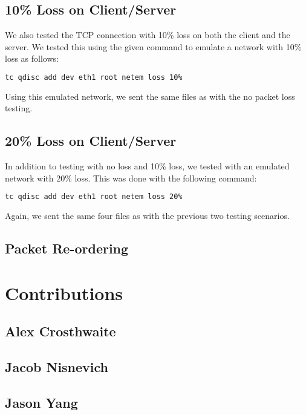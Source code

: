 \documentclass{article}
\begin{document}
\subsection{10\% Loss on Client/Server}

We also tested the TCP connection with 10\% loss on both the client and the server. We tested this using the given command to emulate a network with 10\% loss as follows:

\begin{lstlisting}[language=bash]
tc qdisc add dev eth1 root netem loss 10%
\end{lstlisting}

\noindent
Using this emulated network, we sent the same files as with the no packet loss testing.

\subsection{20\% Loss on Client/Server}

In addition to testing with no loss and 10\% loss, we tested with an emulated network with 20\% loss. This was done with the following command:

\begin{lstlisting}[language=bash]
tc qdisc add dev eth1 root netem loss 20%
\end{lstlisting}

\noindent
Again, we sent the same four files as with the previous two testing scenarios.

\subsection{Packet Re-ordering}

\section{Contributions}

\subsection{Alex Crosthwaite}

\subsection{Jacob Nisnevich}

\subsection{Jason Yang}
\end{document}
